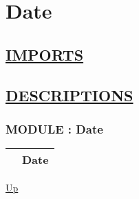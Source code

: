 \chapter*{Date}
\hypertarget{ecldoc:toc:Date}{}

\section*{\underline{IMPORTS}}
\begin{itemize}
\end{itemize}

\section*{\underline{DESCRIPTIONS}}
\subsection*{MODULE : Date}
\hypertarget{ecldoc:Date}{}

{\renewcommand{\arraystretch}{1.5}
\begin{tabularx}{\textwidth}{|>{\raggedright\arraybackslash}l|X|}
\hline
\hspace{0pt} & Date \\
\hline
\end{tabularx}
}

\hyperlink{ecldoc:toc:root}{Up}

\par


